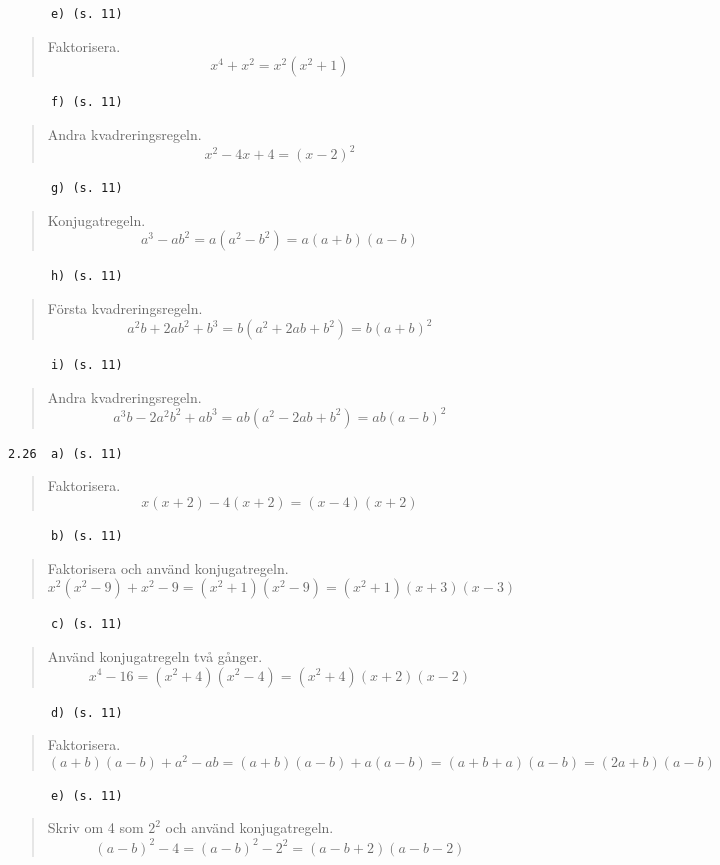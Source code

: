 \documentclass[a4paper]{article}
\newcommand{\tskcol}[1]{\textcolor{tskcol}{#1}}
\begin{document}
	\texttt{\tskcol{~~~~~~e) (s. 11)}}
	\begin{quotation}
		\noindent
		Faktorisera.
		\[x^4+x^2=x^2(x^2+1)\]
	\end{quotation}
	
	\texttt{\tskcol{~~~~~~f) (s. 11)}}
	\begin{quotation}
		\noindent
		Andra kvadreringsregeln.
		\[x^2-4x+4=(x-2)^2\]
	\end{quotation}
	
	\texttt{\tskcol{~~~~~~g) (s. 11)}}
	\begin{quotation}
		\noindent
		Konjugatregeln.
		\[a^3-ab^2=a(a^2-b^2)=a(a+b)(a-b)\]
	\end{quotation}
	
	\texttt{\tskcol{~~~~~~h) (s. 11)}}
	\begin{quotation}
		\noindent
		Första kvadreringsregeln.
		\[a^2b+2ab^2+b^3=b(a^2+2ab+b^2)=b(a+b)^2\]
	\end{quotation}
	
	\texttt{\tskcol{~~~~~~i) (s. 11)}}
	\begin{quotation}
		\noindent
		Andra kvadreringsregeln.
		\[a^3b-2a^2b^2+ab^3=ab(a^2-2ab+b^2)=ab(a-b)^2\]
	\end{quotation}
	
	\texttt{\tskcol{2.26~~a) (s. 11)}}
	\begin{quotation}
		\noindent
		Faktorisera.
		\[x(x+2)-4(x+2)=(x-4)(x+2)\]
	\end{quotation}
	
	\texttt{\tskcol{~~~~~~b) (s. 11)}}
	\begin{quotation}
		\noindent
		Faktorisera och använd konjugatregeln.
		\[x^2(x^2-9)+x^2-9=(x^2+1)(x^2-9)=(x^2+1)(x+3)(x-3)\]
	\end{quotation}
	
	\pagebreak
	\texttt{\tskcol{~~~~~~c) (s. 11)}}
	\begin{quotation}
		\noindent
		Använd konjugatregeln två gånger.
		\[x^4-16=(x^2+4)(x^2-4)=(x^2+4)(x+2)(x-2)\]
	\end{quotation}
	
	\texttt{\tskcol{~~~~~~d) (s. 11)}}
	\begin{quotation}
		\noindent
		Faktorisera.
		\[(a+b)(a-b)+a^2-ab=(a+b)(a-b)+a(a-b)=(a+b+a)(a-b)=(2a+b)(a-b)\]
	\end{quotation}
	
	\texttt{\tskcol{~~~~~~e) (s. 11)}}
	\begin{quotation}
		\noindent
		Skriv om 4 som $2^2$ och använd konjugatregeln.
		\[(a-b)^2-4=(a-b)^2-2^2=(a-b+2)(a-b-2)\]
	\end{quotation}
	
\end{document}
